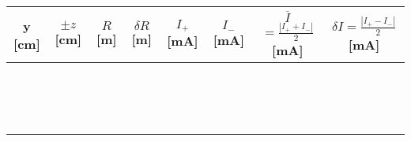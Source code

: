 \documentclass[a4paper,12pt]{article}  %
\begin{document}
\begin{center}
	\begin{tabular}{|c|c|c|c|c|c|c|c|}
	\hline
	y [cm]  & $\pm z$ [cm]  & $R$ [m] & $\delta R$ [m] & $I_+$ [mA] & $I_-$ [mA] & $\overline{I}$   {\tiny $ = \frac{| I_+ + I_-|}{2}$ [mA] } & {\tiny $\delta I = \frac{| I_+ - I_-|}{2}$ [mA] } \\
	\hline
	 &  &  &  & &  &  & \\ \cline{5-8}
	 &  &  &  & &  & & \\ \cline{5-8}
	 &  &  &  & &  & & \\ \cline{5-8}
	 \hline
	 &  &  &  & &  & & \\ \cline{5-8}
	 &  &  &  & &  & & \\ \cline{5-8}
	 &  &  &  & &  & & \\ \cline{5-8}
	 \hline
	 &  &  &  & &  & & \\ \cline{5-8}
	 &  &  &  & &  & & \\ \cline{5-8}
	 &  &  &  & &  & & \\ \cline{5-8}
	 \hline
	 &  &  &  & &  & & \\ \cline{5-8}
	 &  &  &  & &  & & \\ \cline{5-8}
	 &  &  &  & &  & & \\ \cline{5-8}
	 \hline
	 &  &  &  & &  & & \\ \cline{5-8}
	 &  &  &  & &  & & \\ \cline{5-8}
	 &  &  &  & &  & & \\ \cline{5-8}
	 \hline
 	\end{tabular}
\end{center}


\end{document}
